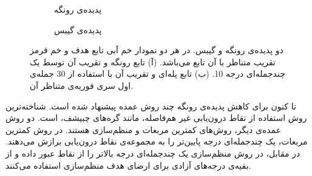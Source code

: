 \documentclass[12pt,onecolumn,a4paper]{article}
\begin{document}
 \begin{figure}
    \centering
    \begin{subfigure}[b]{0.45\textwidth}
        \centering
        \caption{پدیده‌ی رونگه}
        \label{fig:runge}
    \end{subfigure}
    \hfill
    \begin{subfigure}[b]{0.45\textwidth}
        \centering
        \caption{پدیده‌ی گیبس}
        \label{fig:gibbs}
    \end{subfigure}
       \caption{دو پدیده‌ی رونگه و گیبس. در هر دو نمودار خم آبی تابع هدف و خم قرمز تقریب متناظر با آن تابع می‌باشد. (آ) تابع رونگه و تقریب آن توسط یک چندجمله‌ای درجه 10. (ب) تابع پله‌ای و تقریب آن با استفاده از 30 جمله‌ی اول سری فوریه‌ی متناظر آن.}
       \label{fig:runge_gibbs}
\end{figure}

تا کنون برای کاهش پدیده‌ی رونگه چند روش عمده پیشنهاد شده است. شناخته‌ترین روش استفاده از نقاط درون‌یابی غیر هم‌فاصله، مانند گره‌های چبیشف، است. دو روش عمده‌ی دیگر، روش‌های کمترین مربعات و منظم‌سازی هستند. در روش کمترین مربعات، یک چندجمله‌ای درجه پایین‌تر را به مجموعه‌ی نقاط درون‌یابی برازش می‌دهند. در مقابل، در روش منظم‌سازی یک چندجمله‌ای درجه بالاتر را از نقاط عبور داده و از بقیه‌ی درجه‌های آزادی برای ارضای هدف منظم‌سازی استفاده می‌کنند.
\end{document}

